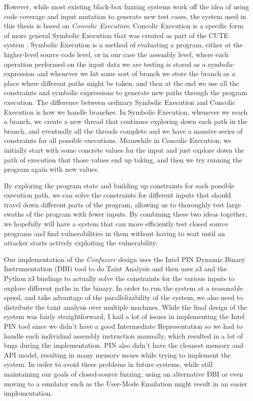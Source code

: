 However, while most existing black-box fuzzing systems work off the idea of
using code coverage and input mutation to generate new test cases, the system
used in this thesis is based on \textit{Concolic Execution}. Concolic Execution
is a specific form of more general Symbolic Execution that was created as part
of the CUTE system \cite{cutesystem}. Symbolic Execution is a method of
evaluating a program, either at the higher-level source code level, or in our
case the assembly level, where each operation performed on the input data we are
testing is stored as a symbolic expression and whenever we hit some sort of
branch we store the branch as a place where different paths might be taken, and
then at the end we use all the constraints and symbolic expressions to generate
new paths through the program execution. The difference between ordinary
Symbolic Execution and Concolic Execution is how we handle branches. In Symbolic
Execution, whenever we reach a branch, we create a new thread that continues
exploring down each path in the branch, and eventually all the threads complete
and we have a massive series of constraints for all possible
executions. Meanwhile in Concolic Execution, we initially start with some
concrete values for the input and just explore down the path of execution that
those values end up taking, and then we try running the program again with new
values.

By exploring the program state and building up constraints for each possible
execution path, we can solve the constraints for different inputs that should
travel down different parts of the program, allowing us to thoroughly test
large swaths of the program with fewer inputs. By combining these two ideas
together, we hopefully will have a system that can more efficiently test closed
source programs and find vulnerabilities in them without having to wait until an
attacker starts actively exploiting the vulnerability.

Our implementation of the \textit{Confuzzer} design uses the Intel PIN Dynamic
Binary Instrumentation (DBI) tool to do Taint Analysis and then uses z3 and the
Python z3 bindings to actually solve the constraints for the various inputs to
explore different paths in the binary. In order to run the system at a
reasonable speed, and take advantage of the parallelizability of the system, we
also need to distribute the taint analysis over multiple machines. While the
final design of the system was fairly straightforward, I had a lot of issues in
implementing the Intel PIN tool since we didn't have a good Intermediate
Representation so we had to handle each individual assembly instruction
manually, which resulted in a lot of bugs during the implementation. PIN also
didn't have the cleanest memory and API model, resulting in many memory issues
while trying to implement the system. In order to avoid these problems in future
systems, while still maintaining our goals of closed-source fuzzing, using an
alternative DBI or even moving to a emulator such as the User-Mode Emulation
might result in an easier implementation.

